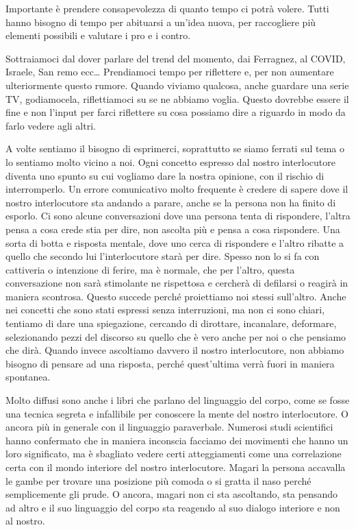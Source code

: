 \documentclass[12pt]{book} %
\begin{document}
Importante è prendere consapevolezza di quanto tempo ci potrà volere. Tutti hanno bisogno di tempo per abituarsi a
un'idea nuova, per raccogliere più elementi possibili e valutare i pro e i
contro.

Sottraiamoci dal dover parlare del trend del momento, dai Ferragnez, al COVID, Israele, San remo ecc… Prendiamoci tempo per riflettere e, per non aumentare ulteriormente questo rumore. Quando viviamo qualcosa, anche guardare una serie TV, godiamocela, riflettiamoci su se ne abbiamo voglia. Questo dovrebbe essere il fine e non l'input per farci riflettere su cosa possiamo dire a riguardo in modo da farlo vedere agli altri.

A volte sentiamo il bisogno di esprimerci, soprattutto se siamo ferrati sul tema o lo sentiamo molto vicino a noi. Ogni
concetto espresso dal nostro interlocutore diventa uno spunto su cui vogliamo dare la nostra opinione, con il rischio
di interromperlo. Un errore comunicativo molto frequente è credere di sapere dove il nostro interlocutore sta andando a
parare, anche se la persona non ha finito di esporlo. Ci sono alcune conversazioni dove una persona tenta di
rispondere, l'altra pensa a cosa crede stia per dire, non ascolta più e pensa a cosa rispondere.
Una sorta di botta e risposta mentale, dove uno cerca di rispondere e l'altro ribatte a quello che
secondo lui l'interlocutore starà per dire. Spesso non lo si fa con cattiveria o intenzione di
ferire, ma è normale, che per l'altro, questa conversazione non sarà stimolante ne rispettosa e
cercherà di defilarsi o reagirà in maniera scontrosa. Questo succede perché proiettiamo noi stessi
sull'altro. Anche nei concetti che sono stati espressi senza interruzioni, ma non ci sono chiari,
tentiamo di dare una spiegazione, cercando di dirottare, incanalare, deformare, selezionando pezzi del discorso su
quello che è vero anche per noi o che pensiamo che dirà. Quando invece ascoltiamo davvero il nostro interlocutore, non
abbiamo bisogno di pensare ad una risposta, perché quest'ultima verrà fuori in maniera spontanea.


\bigskip

Molto diffusi sono anche i libri che parlano del linguaggio del corpo, come se fosse una tecnica segreta e infallibile
per conoscere la mente del nostro interlocutore. O ancora più in generale con il linguaggio paraverbale. Numerosi studi
scientifici hanno confermato che in maniera inconscia facciamo dei movimenti che hanno un loro significato, ma è
sbagliato vedere certi atteggiamenti come una correlazione certa con il mondo interiore del nostro interlocutore.
Magari la persona accavalla le gambe per trovare una posizione più comoda o si gratta il naso perché semplicemente gli
prude. O ancora, magari non ci sta ascoltando, sta pensando ad altro e il suo linguaggio del corpo sta reagendo al suo
dialogo interiore e non al nostro.
\end{document}
